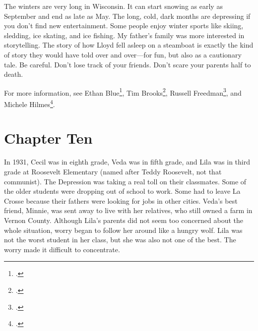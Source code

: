 \documentclass[
  letterpaper,
]{book}
\begin{document}
The winters are very long in Wisconsin. It can start snowing as early as
September and end as late as May. The long, cold, dark months are
depressing if you don't find new entertainment. Some people enjoy winter
sports like skiing, sledding, ice skating, and ice fishing. My father's
family was more interested in storytelling. The story of how Lloyd fell
asleep on a steamboat is exactly the kind of story they would have told
over and over---for fun, but also as a cautionary tale. Be careful.
Don't lose track of your friends. Don't scare your parents half to
death.

For more information, see Ethan Blue\footnote{.}, Tim Brooks\footnote{.}, Russell Freedman\footnote{.}, and
Michele Hilmes\footnote{.}.


\chapter{Chapter Ten}\label{chapter-ten}

In 1931, Cecil was in eighth grade, Veda was in fifth grade, and Lila
was in third grade at Roosevelt Elementary (named after Teddy Roosevelt,
not that communist). The Depression was taking a real toll on their
classmates. Some of the older students were dropping out of school to
work. Some had to leave La Crosse because their fathers were looking for
jobs in other cities. Veda's best friend, Minnie, was sent away to live
with her relatives, who still owned a farm in Vernon County. Although
Lila's parents did not seem too concerned about the whole situation,
worry began to follow her around like a hungry wolf. Lila was not the
worst student in her class, but she was also not one of the best. The
worry made it difficult to concentrate.
\end{document}
